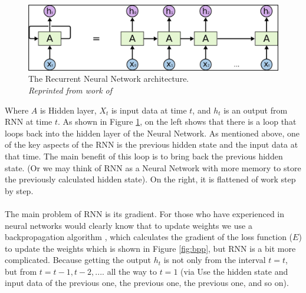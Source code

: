 \begin{figure}[H]
  \centering
   \caption[The Recurrent Neural Network architecture.]{The Recurrent Neural Network architecture. \\\hspace{\textwidth} \emph{Reprinted from work of \citeauthor{olah_2015} \citeyear{olah_2015}}}\label{fig:RNN}
  \includegraphics[scale = 0.2]{figures/RNN.jpg}  
\end{figure}

Where $A$ is Hidden layer, $X_t$ is input data at time $t$, and $h_t$ is an output from RNN at time $t$. As shown in Figure \ref{fig:RNN}, on the left shows that there is a loop that loops back into the hidden layer of the Neural Network. As mentioned above, one of the key aspects of the RNN is the previous hidden state and the input data at that time. The main benefit of this loop is to bring back the previous hidden state. (Or we may think of RNN as a Neural Network with more memory to store the previously calculated hidden state). On the right, it is flattened of work step by step.

\paragraph{}
The main problem of RNN is its gradient. For those who have experienced in neural networks would clearly know that to update weights we use a backpropagation algorithm \cite{arnx_2019}, which calculates the gradient of the loss function ($E$) to update the weights which is shown in Figure \ref{fig:bpp}, but RNN is a bit more complicated. Because getting the output $h_t$ is not only from the interval $t=t$, but from $t=t-1, t-2, ....$ all the way to $t=1$ (via Use the hidden state and input data of the previous one, the previous one, the previous one, and so on).

